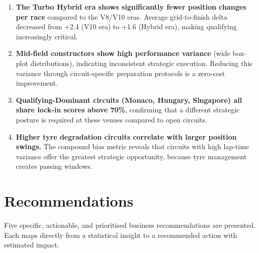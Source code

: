 \documentclass[12pt, a4paper]{article}
\begin{document}
\begin{enumerate}
    \item \textbf{The Turbo Hybrid era shows significantly fewer position changes per race} compared to the V8/V10 eras. Average grid-to-finish delta decreased from +2.4 (V10 era) to +1.6 (Hybrid era), making qualifying increasingly critical.

    \item \textbf{Mid-field constructors show high performance variance} (wide box-plot distributions), indicating inconsistent strategic execution. Reducing this variance through circuit-specific preparation protocols is a zero-cost improvement.

    \item \textbf{Qualifying-Dominant circuits (Monaco, Hungary, Singapore) all share lock-in scores above 70\%}, confirming that a different strategic posture is required at these venues compared to open circuits.

    \item \textbf{Higher tyre degradation circuits correlate with larger position swings.} The compound bias metric reveals that circuits with high lap-time variance offer the greatest strategic opportunity, because tyre management creates passing windows.
\end{enumerate}

\newpage

\section{Recommendations}

Five specific, actionable, and prioritised business recommendations are presented. Each maps directly from a statistical insight to a recommended action with estimated impact.
\end{document}
